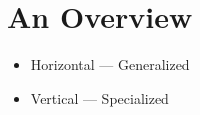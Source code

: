 \documentclass[12pt]{article}
\begin{document}
\section{An Overview}
\begin{itemize}
    \item Horizontal --- Generalized
    \item Vertical --- Specialized
\end{itemize}
\end{document}

